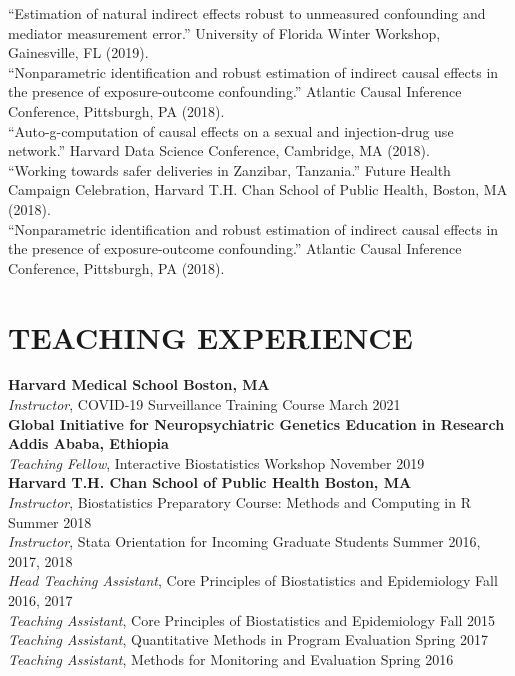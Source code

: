 \documentclass[12pt]{article}
\begin{document}
``Estimation of natural indirect effects robust to unmeasured confounding and mediator measurement error.'' University of Florida Winter Workshop, Gainesville, FL (2019). \\

``Nonparametric identification and robust estimation of indirect causal effects in the presence of exposure-outcome confounding.'' Atlantic Causal Inference Conference, Pittsburgh, PA (2018). \\

``Auto-g-computation of causal effects on a sexual and injection-drug use network.'' Harvard Data Science Conference, Cambridge, MA (2018). \\

``Working towards safer deliveries in Zanzibar, Tanzania.'' Future Health Campaign Celebration, Harvard T.H. Chan School of Public Health, Boston, MA (2018). \\

``Nonparametric identification and robust estimation of indirect causal effects in the presence of exposure-outcome confounding.'' Atlantic Causal Inference Conference, Pittsburgh, PA (2018). 



\section*{\textbf{{\large T}{EACHING} {\large E}{XPERIENCE}}}
\textbf{Harvard Medical School \hfill \hfill Boston, MA} \\
\textit{Instructor}, COVID-19 Surveillance Training Course \hfill \hfill March 2021 \\

\textbf{Global Initiative for Neuropsychiatric Genetics Education in Research \hfill \hfill Addis Ababa, Ethiopia} \\
\textit{Teaching Fellow}, Interactive Biostatistics Workshop \hfill \hfill November 2019 \\

\textbf{Harvard T.H. Chan School of Public Health \hfill \hfill Boston, MA} \\
\textit{Instructor}, Biostatistics Preparatory Course: Methods and Computing in R \hfill \hfill Summer 2018 \\
\textit{Instructor}, Stata Orientation for Incoming Graduate Students \hfill \hfill	Summer 2016, 2017, 2018\\
\textit{Head Teaching Assistant}, Core Principles of Biostatistics and Epidemiology \hfill \hfill Fall 2016, 2017 \\
\textit{Teaching Assistant}, Core Principles of Biostatistics and Epidemiology \hfill \hfill Fall 2015 \\
\textit{Teaching Assistant}, Quantitative Methods in Program Evaluation \hfill \hfill Spring 2017 \\
\textit{Teaching Assistant}, Methods for Monitoring and Evaluation \hfill \hfill Spring 2016 \\
\end{document}
